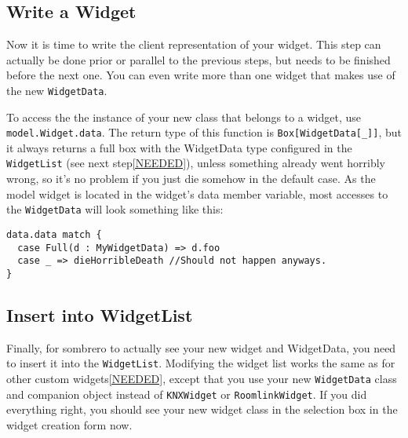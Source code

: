 \subsection{Write a Widget}

Now it is time to write the client representation of your widget. This step can actually be done prior or parallel to the previous steps, but needs to be finished before the next one. You can even write more than one widget that makes use of the new \lstinline!WidgetData!.

To access the the instance of your new class that belongs to a widget, use \lstinline!model.Widget.data!. The return type of this function is \lstinline!Box[WidgetData[_]]!, but it always returns a full box with the WidgetData type configured in the \lstinline!WidgetList! (see next step\ref{NEEDED}), unless something already went horribly wrong, so it's no problem if you just die somehow in the default case. As the model widget is located in the widget's data member variable, most accesses to the \lstinline!WidgetData! will look something like this:

\begin{lstlisting}
data.data match {
  case Full(d : MyWidgetData) => d.foo
  case _ => dieHorribleDeath //Should not happen anyways.
}
\end{lstlisting}


\subsection{Insert into WidgetList}

Finally, for sombrero to actually see your new widget and WidgetData, you need to insert it into the \lstinline!WidgetList!. Modifying the widget list works the same as for other custom widgets\ref{NEEDED}, except that you use your new \lstinline!WidgetData! class and companion object instead of \lstinline!KNXWidget! or \lstinline!RoomlinkWidget!. If you did everything right, you should see your new widget class in the selection box in the widget creation form now.
